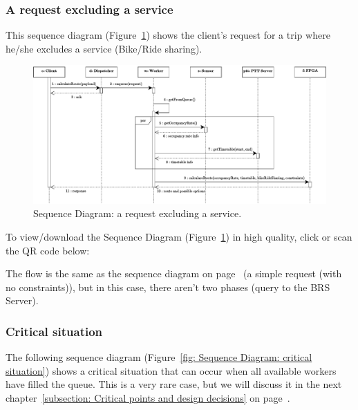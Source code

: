 \documentclass[a4paper]{article}
\begin{document}
    \newpage

    \subsubsection*{A request excluding a service}

    This sequence diagram (Figure~\ref{fig: Sequence Diagram: a request excluding a service}) shows the client's request for a trip where he/she excludes a service (Bike/Ride sharing).

    \begin{figure}[!htp]
        \centering
        \includegraphics[width=\textwidth]{img/sequence-diagram-3.pdf}
        \caption{Sequence Diagram: a request excluding a service.}
        \label{fig: Sequence Diagram: a request excluding a service}
    \end{figure}

    \noindent
    To view/download the Sequence Diagram (Figure~\ref{fig: Sequence Diagram: a request excluding a service}) in high quality, click or scan the QR code below:
    \begin{center}
    \end{center}

    \noindent
    The flow is the same as the sequence diagram on page~\pageref{fig: Sequence Diagram: a simple request (no constraints)} (a simple request (with no constraints)), but in this case, there aren't two phases (query to the BRS Server).

    \newpage

    \subsubsection*{Critical situation}

    The following sequence diagram (Figure~\ref{fig: Sequence Diagram: critical situation}) shows a critical situation that can occur when all available workers have filled the queue. This is a very rare case, but we will discuss it in the next chapter~\ref{subsection: Critical points and design decisions} on page~\pageref{subsection: Critical points and design decisions}.
\end{document}

